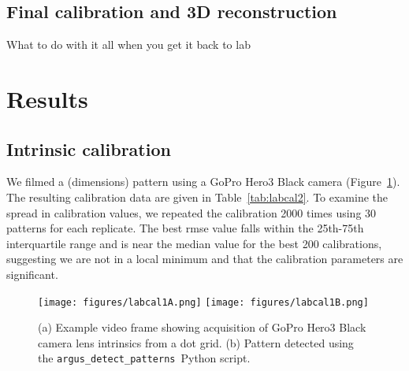 \documentclass[fleqn,10pt]{wlpeerj}
\newcommand{\detectpatterns}{\texttt{argus\_detect\_patterns}}
\begin{document}
\subsection*{Final calibration and 3D reconstruction}
What to do with it all when you get it back to lab





\section*{Results}

\subsection*{Intrinsic calibration}
We filmed a (dimensions) pattern using a GoPro Hero3 Black camera (Figure~\ref{fig:labcal1}).  The resulting calibration data are given in Table~\ref{tab:labcal2}. To examine the spread in calibration values, we repeated the calibration 2000 times using 30 patterns for each replicate. The best rmse value falls within the 25th-75th interquartile range and is near the median value for the best 200 calibrations, suggesting we are not in a local minimum and that the calibration parameters are significant.   

\begin{figure}
\caption{(a) Example video frame showing acquisition of GoPro Hero3 Black camera lens intrinsics from a dot grid.  (b) Pattern detected using the \detectpatterns\ Python script. }
\label{fig:labcal1}
\texttt{[image: figures/labcal1A.png]}
\texttt{[image: figures/labcal1B.png]}
\end{figure}
\end{document}
